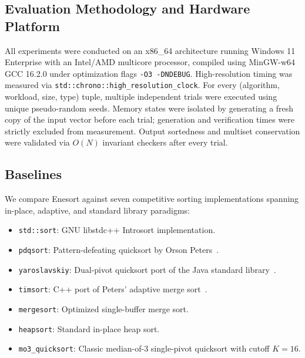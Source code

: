 \documentclass[journal]{IEEEtran}
\begin{document}
\subsection{Evaluation Methodology and Hardware Platform}
All experiments were conducted on an x86\_64 architecture running Windows 11 Enterprise with an Intel/AMD multicore processor, compiled using MinGW-w64 GCC 16.2.0 under optimization flags \texttt{-O3 -DNDEBUG}. High-resolution timing was measured via \texttt{std::chrono::high\_resolution\_clock}.
For every (algorithm, workload, size, type) tuple, multiple independent trials were executed using unique pseudo-random seeds. Memory states were isolated by generating a fresh copy of the input vector before each trial; generation and verification times were strictly excluded from measurement. Output sortedness and multiset conservation were validated via $O(N)$ invariant checkers after every trial.

\subsection{Baselines}
We compare Enesort against seven competitive sorting implementations spanning in-place, adaptive, and standard library paradigms:
\begin{itemize}
    \item \texttt{std::sort}: GNU libstdc++ Introsort implementation.
    \item \texttt{pdqsort}: Pattern-defeating quicksort by Orson Peters~\cite{peters2015pdqsort}.
    \item \texttt{yaroslavskiy}: Dual-pivot quicksort port of the Java standard library~\cite{yaroslavskiy2009dual}.
    \item \texttt{timsort}: C++ port of Peters' adaptive merge sort~\cite{peters2002timsort}.
    \item \texttt{mergesort}: Optimized single-buffer merge sort.
    \item \texttt{heapsort}: Standard in-place heap sort.
    \item \texttt{mo3\_quicksort}: Classic median-of-3 single-pivot quicksort with cutoff $K=16$.
\end{itemize}
\end{document}
